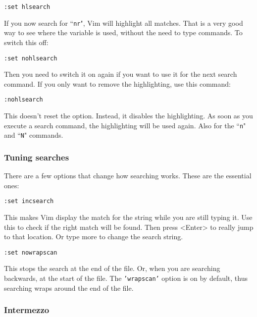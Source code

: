  \begin{Verbatim}[samepage=true]
 :set hlsearch
 \end{Verbatim}

If you now search for ``\texttt{nr}", Vim will highlight all matches.
That is a very good way to see where the variable is used, without the need to type commands.
To switch this off:

 \begin{Verbatim}[samepage=true]
 :set nohlsearch
 \end{Verbatim}

Then you need to switch it on again if you want to use it for the next search
command.  If you only want to remove the highlighting, use this command:

 \begin{Verbatim}[samepage=true]
 :nohlsearch
 \end{Verbatim}

This doesn't reset the option.
Instead, it disables the highlighting.
As soon as you execute a search command, the highlighting will be used again.
Also for the ``\texttt{n}" and ``\texttt{N}" commands.

\subsubsection{Tuning searches}

There are a few options that change how searching works.  These are the
essential ones:

 \begin{Verbatim}[samepage=true]
 :set incsearch
 \end{Verbatim}

This makes Vim display the match for the string while you are still typing it.
Use this to check if the right match will be found.
Then press <Enter> to really jump to that location.
Or type more to change the search string.

 \begin{Verbatim}[samepage=true]
 :set nowrapscan
 \end{Verbatim}

This stops the search at the end of the file.
Or, when you are searching backwards, at the start of the file.
The \texttt{'wrapscan'} option is on by default, thus searching wraps around the end of the file.

\subsubsection{Intermezzo}

